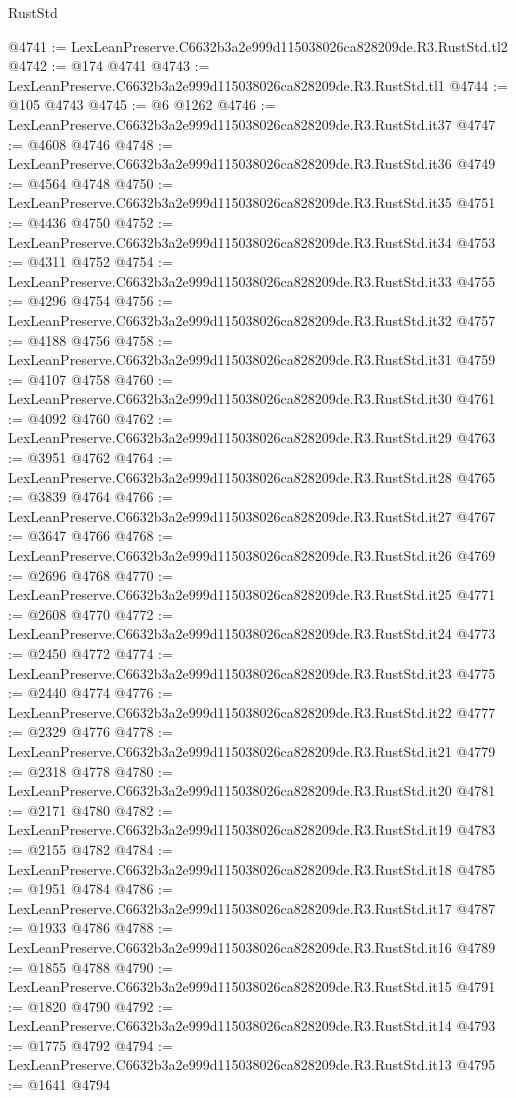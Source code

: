 \begin{lexlean}{RustStd}
\begin{coremodule}
@4741 := LexLeanPreserve.C6632b3a2e999d115038026ca828209de.R3.RustStd.tl2
@4742 := @174 @4741
@4743 := LexLeanPreserve.C6632b3a2e999d115038026ca828209de.R3.RustStd.tl1
@4744 := @105 @4743
@4745 := @6 @1262
@4746 := LexLeanPreserve.C6632b3a2e999d115038026ca828209de.R3.RustStd.it37
@4747 := @4608 @4746
@4748 := LexLeanPreserve.C6632b3a2e999d115038026ca828209de.R3.RustStd.it36
@4749 := @4564 @4748
@4750 := LexLeanPreserve.C6632b3a2e999d115038026ca828209de.R3.RustStd.it35
@4751 := @4436 @4750
@4752 := LexLeanPreserve.C6632b3a2e999d115038026ca828209de.R3.RustStd.it34
@4753 := @4311 @4752
@4754 := LexLeanPreserve.C6632b3a2e999d115038026ca828209de.R3.RustStd.it33
@4755 := @4296 @4754
@4756 := LexLeanPreserve.C6632b3a2e999d115038026ca828209de.R3.RustStd.it32
@4757 := @4188 @4756
@4758 := LexLeanPreserve.C6632b3a2e999d115038026ca828209de.R3.RustStd.it31
@4759 := @4107 @4758
@4760 := LexLeanPreserve.C6632b3a2e999d115038026ca828209de.R3.RustStd.it30
@4761 := @4092 @4760
@4762 := LexLeanPreserve.C6632b3a2e999d115038026ca828209de.R3.RustStd.it29
@4763 := @3951 @4762
@4764 := LexLeanPreserve.C6632b3a2e999d115038026ca828209de.R3.RustStd.it28
@4765 := @3839 @4764
@4766 := LexLeanPreserve.C6632b3a2e999d115038026ca828209de.R3.RustStd.it27
@4767 := @3647 @4766
@4768 := LexLeanPreserve.C6632b3a2e999d115038026ca828209de.R3.RustStd.it26
@4769 := @2696 @4768
@4770 := LexLeanPreserve.C6632b3a2e999d115038026ca828209de.R3.RustStd.it25
@4771 := @2608 @4770
@4772 := LexLeanPreserve.C6632b3a2e999d115038026ca828209de.R3.RustStd.it24
@4773 := @2450 @4772
@4774 := LexLeanPreserve.C6632b3a2e999d115038026ca828209de.R3.RustStd.it23
@4775 := @2440 @4774
@4776 := LexLeanPreserve.C6632b3a2e999d115038026ca828209de.R3.RustStd.it22
@4777 := @2329 @4776
@4778 := LexLeanPreserve.C6632b3a2e999d115038026ca828209de.R3.RustStd.it21
@4779 := @2318 @4778
@4780 := LexLeanPreserve.C6632b3a2e999d115038026ca828209de.R3.RustStd.it20
@4781 := @2171 @4780
@4782 := LexLeanPreserve.C6632b3a2e999d115038026ca828209de.R3.RustStd.it19
@4783 := @2155 @4782
@4784 := LexLeanPreserve.C6632b3a2e999d115038026ca828209de.R3.RustStd.it18
@4785 := @1951 @4784
@4786 := LexLeanPreserve.C6632b3a2e999d115038026ca828209de.R3.RustStd.it17
@4787 := @1933 @4786
@4788 := LexLeanPreserve.C6632b3a2e999d115038026ca828209de.R3.RustStd.it16
@4789 := @1855 @4788
@4790 := LexLeanPreserve.C6632b3a2e999d115038026ca828209de.R3.RustStd.it15
@4791 := @1820 @4790
@4792 := LexLeanPreserve.C6632b3a2e999d115038026ca828209de.R3.RustStd.it14
@4793 := @1775 @4792
@4794 := LexLeanPreserve.C6632b3a2e999d115038026ca828209de.R3.RustStd.it13
@4795 := @1641 @4794

\end{coremodule}
\end{lexlean}
